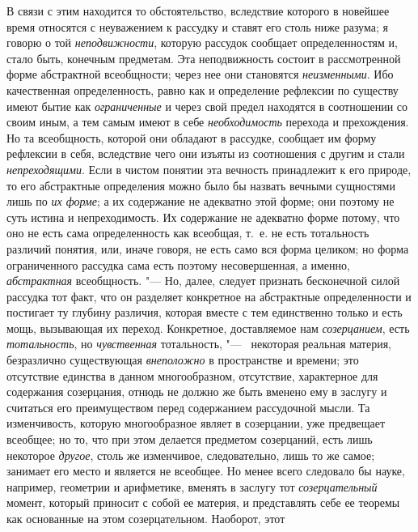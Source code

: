 {В связи с этим находится то обстоятельство, вследствие
которого в новейшее время относятся с неуважением к рассудку и ставят его
столь ниже
разума;
я говорю о той
{\em неподвижности},
которую рассудок сообщает определенностям и, стало быть,
конечным предметам. Эта неподвижность состоит в рассмотренной форме
абстрактной всеобщности; через нее они становятся
{\em неизменными}. Ибо
качественная определенность, равно как и определение рефлексии по существу
имеют бытие как {\em ограниченные}
и через свой предел находятся в соотношении со своим иным,
а тем самым имеют в себе
{\em необходимость}
перехода и прехождения. Но та всеобщность, которой они
обладают в рассудке, сообщает им форму рефлексии в себя, вследствие чего
они изъяты из соотношения с другим и стали
{\em непреходящими}. Если
в чистом понятии эта вечность принадлежит к его природе, то его абстрактные
определения можно было бы назвать вечными сущностями лишь по
{\em их форме}; а их
содержание не адекватно этой форме; они поэтому не суть
истина и непреходимость. Их содержание не адекватно форме потому, что оно
не есть сама определенность как всеобщая, т.~е. не есть тотальность
различий понятия, или, иначе говоря, не есть само вся форма целиком; но
форма ограниченного рассудка сама есть поэтому несовершенная, а именно,
{\em абстрактная}
всеобщность. "--- Но, далее, следует признать
бесконечной силой рассудка тот факт, что он разделяет конкретное на
абстрактные определенности и постигает ту глубину различия, которая вместе
с тем единственно только и есть мощь, вызывающая их переход. Конкретное,
доставляемое нам {\em созерцанием},
есть {\em тотальность},
но {\em чувственная}
тотальность, "--- \ некоторая реальная материя,
безразлично существующая
{\em внеположно} в
пространстве и времени; это отсутствие единства в данном многообразном,
отсутствие, характерное для содержания созерцания, отнюдь не должно же быть
вменено ему в заслугу и считаться его преимуществом перед содержанием
рассудочной мысли. Та изменчивость, которую многообразное являет в
созерцании, уже предвещает всеобщее; но то, что при этом делается предметом
созерцаний, есть лишь некоторое
{\em другое}, столь же
изменчивое, следовательно, лишь то же самое; занимает его место и является
не всеобщее. Но менее всего следовало бы науке, например, геометрии и
арифметике, вменять в заслугу тот
{\em созерцательный}
момент, который приносит с собой ее материя, и представлять
себе ее теоремы как основанные на этом созерцательном. Наоборот, этот
}
